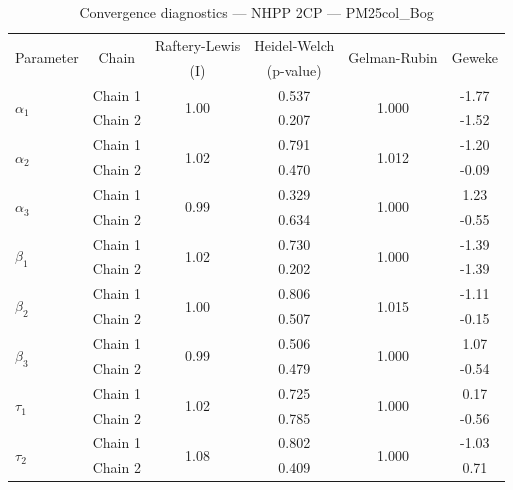 \begin{table}[H]
\centering
\caption{Convergence diagnostics — NHPP 2CP — PM25col_Bog}
\begin{tabular}{lccccc}
\toprule
\multirow{2}{*}{Parameter} & \multirow{2}{*}{Chain} & Raftery-Lewis & Heidel-Welch & \multirow{2}{*}{Gelman-Rubin} & \multirow{2}{*}{Geweke} \\
 & & (I) & (p-value) & & (z) \\
\midrule
\multirow{2}{*}{$\alpha_1$} & Chain 1 & \multirow{2}{*}{1.00} & 0.537 & \multirow{2}{*}{1.000} & -1.77 \\
 & Chain 2 & & 0.207 & & -1.52 \\
\multirow{2}{*}{$\alpha_2$} & Chain 1 & \multirow{2}{*}{1.02} & 0.791 & \multirow{2}{*}{1.012} & -1.20 \\
 & Chain 2 & & 0.470 & & -0.09 \\
\multirow{2}{*}{$\alpha_3$} & Chain 1 & \multirow{2}{*}{0.99} & 0.329 & \multirow{2}{*}{1.000} & 1.23 \\
 & Chain 2 & & 0.634 & & -0.55 \\
\midrule
\multirow{2}{*}{$\beta_1$} & Chain 1 & \multirow{2}{*}{1.02} & 0.730 & \multirow{2}{*}{1.000} & -1.39 \\
 & Chain 2 & & 0.202 & & -1.39 \\
\multirow{2}{*}{$\beta_2$} & Chain 1 & \multirow{2}{*}{1.00} & 0.806 & \multirow{2}{*}{1.015} & -1.11 \\
 & Chain 2 & & 0.507 & & -0.15 \\
\multirow{2}{*}{$\beta_3$} & Chain 1 & \multirow{2}{*}{0.99} & 0.506 & \multirow{2}{*}{1.000} & 1.07 \\
 & Chain 2 & & 0.479 & & -0.54 \\
\midrule
\multirow{2}{*}{$\tau_1$} & Chain 1 & \multirow{2}{*}{1.02} & 0.725 & \multirow{2}{*}{1.000} & 0.17 \\
 & Chain 2 & & 0.785 & & -0.56 \\
\multirow{2}{*}{$\tau_2$} & Chain 1 & \multirow{2}{*}{1.08} & 0.802 & \multirow{2}{*}{1.000} & -1.03 \\
 & Chain 2 & & 0.409 & & 0.71 \\
\bottomrule
\end{tabular}
\end{table}
